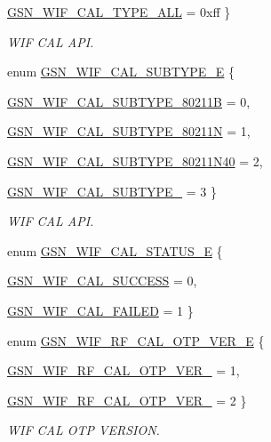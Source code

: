\begin{DoxyCompactItemize}
\par
\hyperlink{a00607_a8806538ca7eb7172842f91d2d44d38f7a845e00dd4243ccea419422e3bebf38c6}{GSN\_\-WIF\_\-CAL\_\-TYPE\_\-ALL} =  0xff
 \}
\begin{DoxyCompactList}\small\item\em WIF CAL API. \end{DoxyCompactList}\item 
enum \hyperlink{a00607_af3a815815ae9fc3d8f892d4d89ac90aa}{GSN\_\-WIF\_\-CAL\_\-SUBTYPE\_\-E} \{ \par
\hyperlink{a00607_af3a815815ae9fc3d8f892d4d89ac90aaa7c7d7e1f1e1bff5b192fc2ba49f8e53d}{GSN\_\-WIF\_\-CAL\_\-SUBTYPE\_\-80211B} =  0, 
\par
\hyperlink{a00607_af3a815815ae9fc3d8f892d4d89ac90aaaaac48d34aaa95b83d64f4e241b0b68b3}{GSN\_\-WIF\_\-CAL\_\-SUBTYPE\_\-80211N} =  1, 
\par
\hyperlink{a00607_af3a815815ae9fc3d8f892d4d89ac90aaa4bdb5cb22a7b002090afda095c439494}{GSN\_\-WIF\_\-CAL\_\-SUBTYPE\_\-80211N40} =  2, 
\par
\hyperlink{a00607_af3a815815ae9fc3d8f892d4d89ac90aaa31a923fb3842a69f280e453e4ef0d26e}{GSN\_\-WIF\_\-CAL\_\-SUBTYPE\_} =  3
 \}
\begin{DoxyCompactList}\small\item\em WIF CAL API. \end{DoxyCompactList}\item 
enum \hyperlink{a00607_a838df779eaf2331fe78602a674a579bf}{GSN\_\-WIF\_\-CAL\_\-STATUS\_\-E} \{ \par
\hyperlink{a00607_a838df779eaf2331fe78602a674a579bfa737cc686bf22492e1ac562012fb90ab0}{GSN\_\-WIF\_\-CAL\_\-SUCCESS} =  0, 
\par
\hyperlink{a00607_a838df779eaf2331fe78602a674a579bfa754118b743593d671e2b87d8d02ee9d5}{GSN\_\-WIF\_\-CAL\_\-FAILED} =  1
 \}
\item 
enum \hyperlink{a00607_a26bfefcbc5fe1a4e7be7bf911f5a6487}{GSN\_\-WIF\_\-RF\_\-CAL\_\-OTP\_\-VER\_\-E} \{ \par
\hyperlink{a00607_a26bfefcbc5fe1a4e7be7bf911f5a6487aa5db29e23c8d9d444f3e0e78d963ebdc}{GSN\_\-WIF\_\-RF\_\-CAL\_\-OTP\_\-VER\_} =  1, 
\par
\hyperlink{a00607_a26bfefcbc5fe1a4e7be7bf911f5a6487ab83ff3c11977c25af63ed7227b325048}{GSN\_\-WIF\_\-RF\_\-CAL\_\-OTP\_\-VER\_} =  2
 \}
\begin{DoxyCompactList}\small\item\em WIF CAL OTP VERSION. \end{DoxyCompactList}\end{DoxyCompactItemize}


